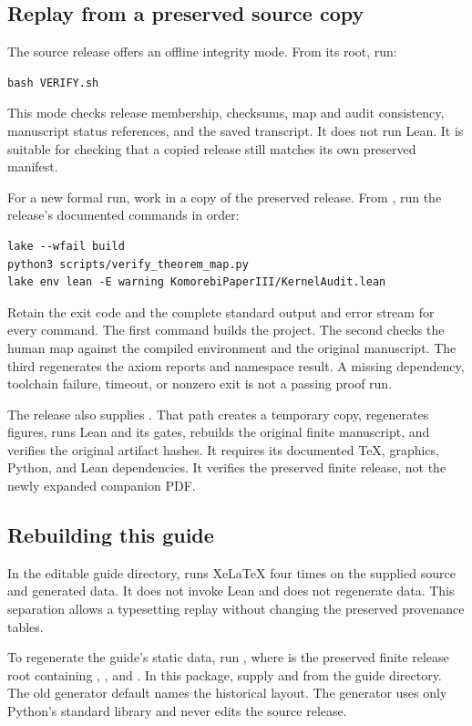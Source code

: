 \subsection{Replay from a preserved source copy}
The source release offers an offline integrity mode. From its root, run:
\begin{Verbatim}[fontsize=\small,frame=leftline,breaklines=true]
bash VERIFY.sh
\end{Verbatim}
This mode checks release membership, checksums, map and audit consistency, manuscript status references, and the saved transcript. It does not run Lean. It is suitable for checking that a copied release still matches its own preserved manifest.

For a new formal run, work in a copy of the preserved release. From , run the release's documented commands in order:
\begin{Verbatim}[fontsize=\small,frame=leftline,breaklines=true]
lake --wfail build
python3 scripts/verify_theorem_map.py
lake env lean -E warning KomorebiPaperIII/KernelAudit.lean
\end{Verbatim}
Retain the exit code and the complete standard output and error stream for every command. The first command builds the project. The second checks the human map against the compiled environment and the original manuscript. The third regenerates the axiom reports and namespace result. A missing dependency, toolchain failure, timeout, or nonzero exit is not a passing proof run.

The release also supplies . That path creates a temporary copy, regenerates figures, runs Lean and its gates, rebuilds the original finite manuscript, and verifies the original artifact hashes. It requires its documented TeX, graphics, Python, and Lean dependencies. It verifies the preserved finite release, not the newly expanded companion PDF.

\subsection{Rebuilding this guide}
In the editable guide directory,  runs XeLaTeX four times on the supplied source and generated data. It does not invoke Lean and does not regenerate data. This separation allows a typesetting replay without changing the preserved provenance tables.

To regenerate the guide's static data, run , where  is the preserved finite release root containing , , and . In this package, supply  and  from the guide directory. The old generator default names the historical layout. The generator uses only Python's standard library and never edits the source release.


